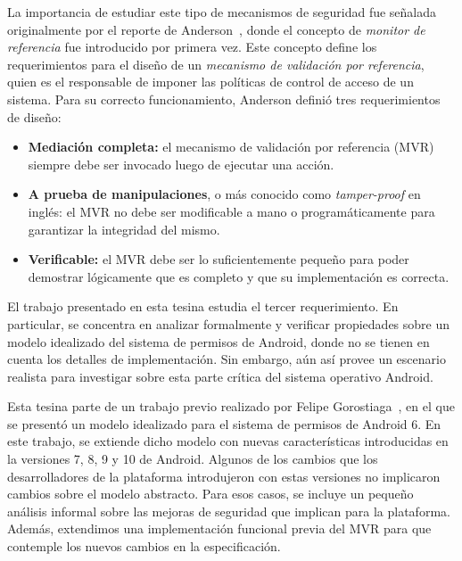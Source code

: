 La importancia de estudiar este tipo de mecanismos de seguridad fue señalada originalmente por el
reporte de Anderson~\cite{Anderson:1972}, donde el concepto de \textit{monitor de referencia} fue
introducido por primera vez. Este concepto define los requerimientos para el diseño de un
\textit{mecanismo de validación por referencia}, quien es el responsable de imponer las políticas de
control de acceso de un sistema. Para su correcto funcionamiento, Anderson definió tres
requerimientos de diseño:

\begin{itemize}
    \item \textbf{Mediación completa:} el mecanismo de validación por referencia (MVR) siempre debe
          ser invocado luego de ejecutar una acción.
    \item \textbf{A prueba de manipulaciones}, o más conocido como \textit{tamper-proof} en inglés:
          el MVR no debe ser modificable a mano o programáticamente para garantizar la
          integridad del mismo.
    \item \textbf{Verificable:} el MVR debe ser lo suficientemente pequeño para poder demostrar
          lógicamente que es completo y que su implementación es correcta.
\end{itemize}

El trabajo presentado en esta tesina estudia el tercer requerimiento. En particular, se concentra en
analizar formalmente y verificar propiedades sobre un modelo idealizado del sistema de permisos de
Android, donde no se tienen en cuenta los detalles de implementación. Sin embargo, aún así provee un
escenario realista para investigar sobre esta parte crítica del sistema operativo Android.

Esta tesina parte de un trabajo previo realizado por Felipe Gorostiaga~\cite{fgorostiaga}, en el que
se presentó un modelo idealizado para el sistema de permisos de Android 6. En este trabajo, se
extiende dicho modelo con nuevas características introducidas en la versiones 7, 8, 9 y 10 de
Android. Algunos de los cambios que los desarrolladores de la plataforma introdujeron con estas
versiones no implicaron cambios sobre el modelo abstracto. Para esos casos, se incluye un pequeño
análisis informal sobre las mejoras de seguridad que implican para la plataforma. Además, extendimos
una implementación funcional previa del MVR para que contemple los nuevos cambios en la
especificación.

